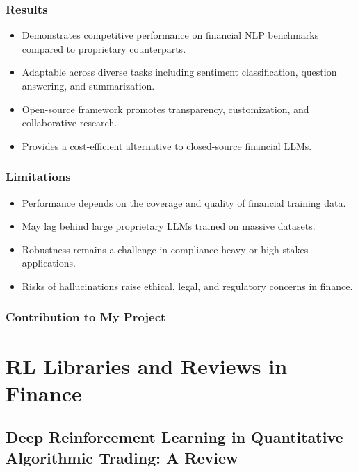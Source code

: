 \documentclass[12pt,a4paper]{report}
\begin{document}
\subsubsection{Results}
\begin{itemize}
    \item Demonstrates competitive performance on financial NLP benchmarks compared to proprietary counterparts.  
    \item Adaptable across diverse tasks including sentiment classification, question answering, and summarization.  
    \item Open-source framework promotes transparency, customization, and collaborative research.  
    \item Provides a cost-efficient alternative to closed-source financial LLMs.  
\end{itemize}

\subsubsection{Limitations}
\begin{itemize}
    \item Performance depends on the coverage and quality of financial training data.  
    \item May lag behind large proprietary LLMs trained on massive datasets.  
    \item Robustness remains a challenge in compliance-heavy or high-stakes applications.  
    \item Risks of hallucinations raise ethical, legal, and regulatory concerns in finance.  
\end{itemize}

\subsubsection{Contribution to My Project}


\section{RL Libraries and Reviews in Finance}

\subsection{Deep Reinforcement Learning in Quantitative Algorithmic Trading: A Review \cite{pricope2021deep}}
\end{document}
